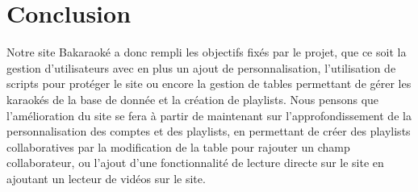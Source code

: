 \section{Conclusion}
Notre site Bakaraoké a donc rempli les objectifs fixés par le projet, que ce soit la gestion d'utilisateurs
avec en plus un ajout de personnalisation, l'utilisation de scripts pour protéger le site ou encore la gestion
de tables permettant de gérer les karaokés de la base de donnée et la création de playlists.\newline
\newline
Nous pensons que l'amélioration du site se fera à partir de maintenant sur l'approfondissement de la personnalisation des comptes
et des playlists, en permettant de créer des playlists collaboratives par la modification de la table pour rajouter un champ collaborateur,
ou l'ajout d'une fonctionnalité de lecture directe sur le site en ajoutant un lecteur de vidéos sur le site.
